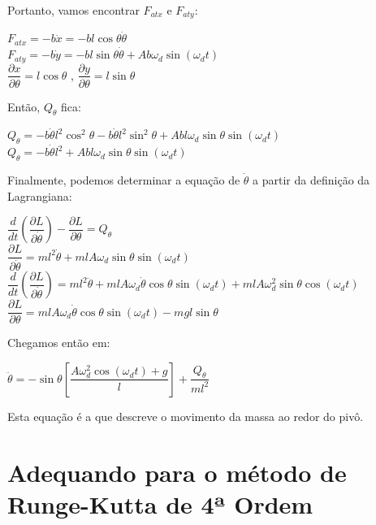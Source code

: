 \documentclass[13pt,a4paper]{report}
\begin{document}
Portanto, vamos encontrar  $ F_{atx} $  e $ F_{aty} $:
\begin{center}
$
F_{atx} = -b\dot{x} = -bl\cos\theta\dot{\theta}
$
\\[2mm]
$
F_{aty} = -b\dot{y} = -bl\sin\theta\dot{\theta} + Ab\omega_{d}\sin(\omega_{d}t)
$
\\[2mm]
$
\dfrac{\partial x}{\partial \theta} = l\cos\theta
$
, 
$
\dfrac{\partial y}{\partial \theta} = l\sin\theta
$
\end{center}

Então, $Q_{\theta}$ fica:

\begin{center}
$
Q_{\theta} = 
-b\dot{\theta}l^{2}\cos^{2}\theta
-b\dot{\theta}l^{2}\sin^{2}\theta
+Abl\omega_{d}\sin\theta\sin(\omega_{d} t)
$
\\[2mm]
$
Q_{\theta} = 
-b\dot{\theta}l^{2}
+Abl\omega_{d}\sin\theta\sin(\omega_{d} t)
$
\end{center}

Finalmente, podemos determinar a equação de $ \dot{\theta} $
a partir da definição da Lagrangiana:
\begin{center}
$
\dfrac{d}{dt} \left(\dfrac{\partial L}{\partial \dot{\theta}}\right)
- \dfrac{\partial L}{\partial \theta} = Q_{\theta}
$
\\[2mm]
$
\dfrac{\partial L}{\partial \dot{\theta}} = 
ml^{2}\dot{\theta} + mlA\omega_{d}\sin\theta\sin(\omega_{d} t)
$
\\[2mm]
$
\dfrac{d}{dt} \left(\dfrac{\partial L}{\partial \dot{\theta}}\right) = 
ml^{2}\ddot{\theta} 
+ mlA\omega_{d}\dot{\theta}\cos\theta\sin(\omega_{d} t)
+ mlA\omega_{d}^{2}\sin\theta\cos(\omega_{d} t)
$
\\[2mm]
$
\dfrac{\partial L}{\partial \theta} = 
mlA\omega_{d}\dot{\theta}\cos\theta\sin(\omega_{d} t)
-mgl\sin\theta
$
\end{center}

Chegamos então em:
\begin{center}
$
\ddot{\theta} = 
-\sin\theta
\left[\dfrac{A\omega_{d}^{2} \cos(\omega_{d} t) + g }{l}\right]
+ \dfrac{Q_{\theta}}{ml^{2}}
$
\end{center}

Esta equação é a que descreve o movimento da massa ao redor do pivô.
\clearpage

	\section{Adequando para  o método de Runge-Kutta de 4ª Ordem}
	
\end{document}
